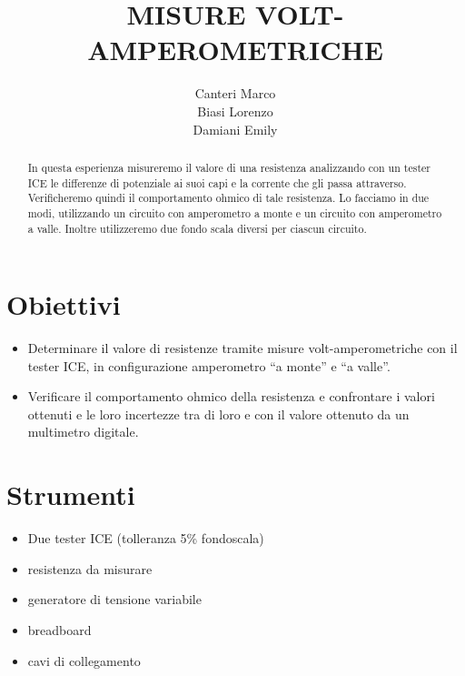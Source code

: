 \documentclass[12pt]{article}
\title{\textbf{MISURE VOLT- AMPEROMETRICHE} }
\author{Canteri Marco\\Biasi Lorenzo\\Damiani Emily}
\date{}
\begin{document}
  
	\newpage
	\renewcommand{\abstractname}{Abstract}
	
	\begin{abstract}
In questa esperienza misureremo il valore di una resistenza analizzando con un tester ICE le differenze di potenziale ai suoi capi e la corrente che gli passa attraverso. Verificheremo quindi il comportamento ohmico di tale resistenza. Lo facciamo in due modi, utilizzando un circuito con amperometro a monte e un circuito con amperometro a valle. Inoltre utilizzeremo due fondo scala diversi per ciascun circuito. 
	\end{abstract}
  \vspace{10em}
\tableofcontents
  \newpage
\section{Obiettivi}
\begin{itemize}
\item Determinare il valore di resistenze tramite misure volt-amperometriche con il tester
ICE, in configurazione amperometro “a monte” e “a valle”.
\item Verificare il comportamento ohmico della resistenza e confrontare i valori ottenuti e
le loro incertezze tra di loro e con il valore ottenuto da un multimetro digitale.
\end{itemize}
\section{Strumenti}
\begin{itemize}
\item Due tester ICE (tolleranza 5\% fondoscala)
\item resistenza da misurare
\item generatore di tensione variabile
\item breadboard
\item cavi di collegamento
\end{itemize}
\end{document}
